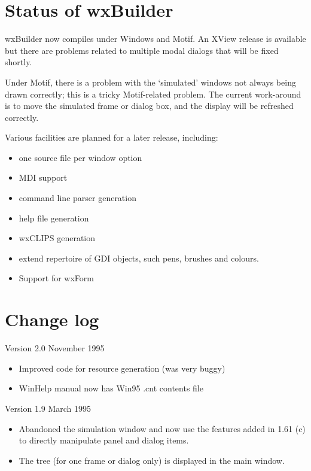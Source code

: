 \section{Status of wxBuilder}

wxBuilder now compiles under Windows and Motif. An XView release is
available but there are problems related to multiple modal dialogs that
will be fixed shortly.

Under Motif, there is a problem with the `simulated' windows not always
being drawn correctly; this is a tricky Motif-related problem. The
current work-around is to move the simulated frame or dialog box, and
the display will be refreshed correctly.

Various facilities are planned for a later release, including:

\begin{itemize}
\item one source file per window option
\item MDI support
\item command line parser generation
\item help file generation
\item wxCLIPS generation
\item extend repertoire of GDI objects, such pens, brushes and colours.
\item Support for wxForm
\end{itemize}

\section{Change log}

Version 2.0 November 1995

\begin{itemize}\itemsep=0pt
\item Improved code for resource generation (was very buggy)
\item WinHelp manual now has Win95 .cnt contents file
\end{itemize}

Version 1.9 March 1995

\begin{itemize}\itemsep=0pt
\item Abandoned the simulation window and now use
the features added in 1.61 (c) to directly manipulate
panel and dialog items.
\item The tree (for one frame or dialog only) is displayed
in the main window.
\end{itemize}

